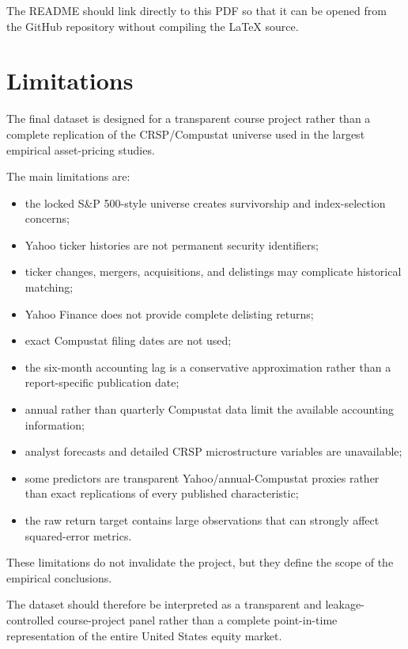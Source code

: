 \documentclass[11pt,a4paper]{article}
\begin{document}
The README should link directly to this PDF so that it can be opened from the
GitHub repository without compiling the LaTeX source.


\section{Limitations}

The final dataset is designed for a transparent course project rather than a
complete replication of the CRSP/Compustat universe used in the largest
empirical asset-pricing studies.

The main limitations are:

\begin{itemize}
  \item the locked S\&P 500-style universe creates survivorship and
        index-selection concerns;
  \item Yahoo ticker histories are not permanent security identifiers;
  \item ticker changes, mergers, acquisitions, and delistings may complicate
        historical matching;
  \item Yahoo Finance does not provide complete delisting returns;
  \item exact Compustat filing dates are not used;
  \item the six-month accounting lag is a conservative approximation rather
        than a report-specific publication date;
  \item annual rather than quarterly Compustat data limit the available
        accounting information;
  \item analyst forecasts and detailed CRSP microstructure variables are
        unavailable;
  \item some predictors are transparent Yahoo/annual-Compustat proxies rather
        than exact replications of every published characteristic;
  \item the raw return target contains large observations that can strongly
        affect squared-error metrics.
\end{itemize}

These limitations do not invalidate the project, but they define the scope of
the empirical conclusions.

The dataset should therefore be interpreted as a transparent and
leakage-controlled course-project panel rather than a complete point-in-time
representation of the entire United States equity market.
\end{document}
